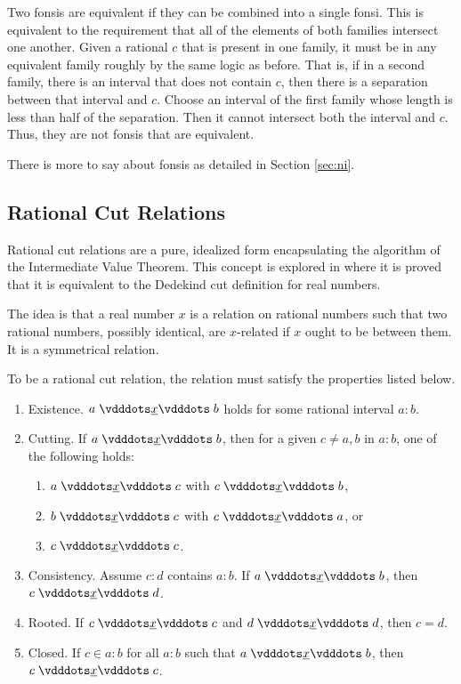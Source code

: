 \documentclass[12pt]{article}
\begin{document}
Two fonsis are equivalent if they can be combined into a single fonsi. This is equivalent to the requirement that all of the elements of both families intersect one another. Given a rational $c$ that is present in one family, it must be in any equivalent family roughly by the same logic as before. That is, if in a second family, there is an interval that does not contain $c$, then there is a separation between that interval and $c$. Choose an interval of the first family whose length is less than half of the separation. Then it cannot intersect both the interval and $c$. Thus, they are not fonsis that are equivalent. 

There is more to say about fonsis as detailed in Section \ref{sec:ni}.

\subsection{Rational Cut Relations}

Rational cut relations are a pure, idealized form encapsulating the algorithm of the Intermediate Value Theorem. This concept is explored in \cite{taylor24dedekind} where it is proved that it is equivalent to the Dedekind cut definition for real numbers. 

The idea is that a real number $x$ is a relation on rational numbers such that two rational numbers, possibly identical, are $x$-related if $x$ ought to be between them. It is a symmetrical relation. 

To be a rational cut relation, the relation must satisfy the properties listed below.
\begin{enumerate}
    \item Existence. $a \xrel b$ holds for some rational interval $a:b$.
    \item Cutting. If $a \xrel b$, then for a given $c \neq a, b$ in $a:b$, one of the following holds: 
        \begin{enumerate}
            \item $a \xrel c$ with \sout{$c \xrel b$},
            \item $b \xrel c$ with \sout{$c \xrel a$}, or
            \item $c \xrel c$.
        \end{enumerate}
    \item Consistency. Assume $c:d$ contains $a:b$. If $a \xrel b$, then $ c \xrel d$. 
    \item Rooted. If $c \xrel c$ and $d \xrel d$, then $c=d$.
    \item Closed. If $c \in a:b$ for all $a:b$ such that $a \xrel b$, then $c \xrel c$. 
\end{enumerate}
\end{document}
